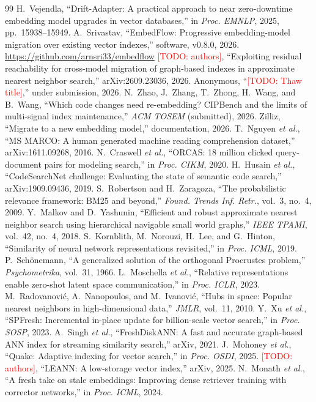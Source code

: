 \documentclass[conference]{IEEEtran}
\newcommand{\todo}[1]{\textcolor{red}{[TODO: #1]}}
\begin{document}
\begin{thebibliography}{99}
 H.~Vejendla, ``Drift-Adapter: A practical approach to near
zero-downtime embedding model upgrades in vector databases,'' in \emph{Proc. EMNLP},
2025, pp.~15938--15949.
 A.~Srivastav, ``EmbedFlow: Progressive embedding-model migration
over existing vector indexes,'' software, v0.8.0, 2026.
\url{https://github.com/arnsri33/embedflow}
 \todo{authors}, ``Exploiting residual reachability for cross-model
migration of graph-based indexes in approximate nearest neighbor search,''
arXiv:2609.23036, 2026.
 Anonymous, ``\todo{Thaw title},'' under submission, 2026.
 N.~Zhao, J.~Zhang, T.~Zhong, H.~Wang, and B.~Wang, ``Which code
changes need re-embedding? CIPBench and the limits of multi-signal index
maintenance,'' \emph{ACM TOSEM} (submitted), 2026.
 Zilliz, ``Migrate to a new embedding model,'' documentation,
2026.
 T.~Nguyen \emph{et al.}, ``MS MARCO: A human generated machine reading
comprehension dataset,'' arXiv:1611.09268, 2016.
 N.~Craswell \emph{et al.}, ``ORCAS: 18 million clicked query-document
pairs for modeling search,'' in \emph{Proc. CIKM}, 2020.
 H.~Husain \emph{et al.}, ``CodeSearchNet challenge: Evaluating
the state of semantic code search,'' arXiv:1909.09436, 2019.
 S.~Robertson and H.~Zaragoza, ``The probabilistic relevance framework:
BM25 and beyond,'' \emph{Found. Trends Inf. Retr.}, vol.~3, no.~4, 2009.
 Y.~Malkov and D.~Yashunin, ``Efficient and robust approximate nearest
neighbor search using hierarchical navigable small world graphs,'' \emph{IEEE TPAMI},
vol.~42, no.~4, 2018.
 S.~Kornblith, M.~Norouzi, H.~Lee, and G.~Hinton, ``Similarity of neural
network representations revisited,'' in \emph{Proc. ICML}, 2019.
 P.~Sch\"onemann, ``A generalized solution of the orthogonal
Procrustes problem,'' \emph{Psychometrika}, vol.~31, 1966.
 L.~Moschella \emph{et al.}, ``Relative representations enable zero-shot
latent space communication,'' in \emph{Proc. ICLR}, 2023.
 M.~Radovanovi\'c, A.~Nanopoulos, and M.~Ivanovi\'c, ``Hubs in space:
Popular nearest neighbors in high-dimensional data,'' \emph{JMLR}, vol.~11, 2010.
 Y.~Xu \emph{et al.}, ``SPFresh: Incremental in-place update for
billion-scale vector search,'' in \emph{Proc. SOSP}, 2023.
 A.~Singh \emph{et al.}, ``FreshDiskANN: A fast and accurate
graph-based ANN index for streaming similarity search,'' arXiv, 2021.
 J.~Mohoney \emph{et al.}, ``Quake: Adaptive indexing for vector search,''
in \emph{Proc. OSDI}, 2025.
 \todo{authors}, ``LEANN: A low-storage vector index,'' arXiv, 2025.
 N.~Monath \emph{et al.}, ``A fresh take on stale embeddings:
Improving dense retriever training with corrector networks,'' in \emph{Proc. ICML},
2024.
\end{thebibliography}
\end{document}
